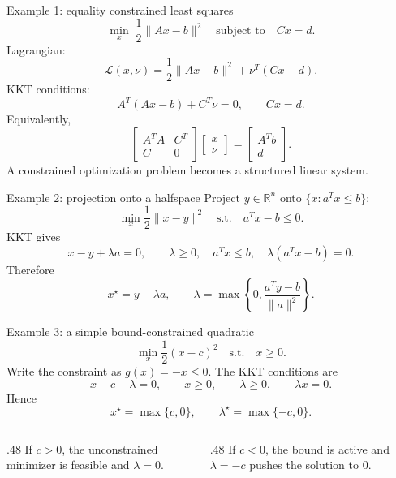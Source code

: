 \documentclass[aspectratio=169]{beamer}
\newcommand{\R}{\mathbb{R}}
\newcommand{\Lagr}{\mathcal{L}}
\begin{document}
\begin{frame}{Example 1: equality constrained least squares}
  \[
    \min_x \; \frac12\|Ax-b\|^2
    \quad \text{subject to}\quad Cx=d.
  \]
  Lagrangian:
  \[
    \Lagr(x,\nu)=\frac12\|Ax-b\|^2+\nu^T(Cx-d).
  \]
  KKT conditions:
  \[
    A^T(Ax-b)+C^T\nu=0,
    \qquad Cx=d.
  \]
  Equivalently,
  \[
    \begin{bmatrix}
      A^TA & C^T\\
      C & 0
    \end{bmatrix}
    \begin{bmatrix}x\\ \nu\end{bmatrix}
    =
    \begin{bmatrix}A^Tb\\ d\end{bmatrix}.
  \]
  A constrained optimization problem becomes a structured linear system.
\end{frame}

\begin{frame}{Example 2: projection onto a halfspace}
  Project $y\in\R^n$ onto $\{x:a^Tx\le b\}$:
  \[
    \min_x \frac12\|x-y\|^2\quad\text{s.t.}\quad a^Tx-b\le 0.
  \]
  KKT gives
  \[
    x-y+\lambda a=0,\qquad \lambda\ge0,
    \quad a^Tx\le b,
    \quad \lambda(a^Tx-b)=0.
  \]
  Therefore
  \[
    x^\star=y-\lambda a,
    \qquad
    \lambda=\max\left\{0,\frac{a^Ty-b}{\|a\|^2}\right\}.
  \]
  \begin{center}
  \end{center}
\end{frame}

\begin{frame}{Example 3: a simple bound-constrained quadratic}
  \[
    \min_x \frac12(x-c)^2\quad\text{s.t.}\quad x\ge 0.
  \]
  Write the constraint as $g(x)=-x\le0$. The KKT conditions are
  \[
    x-c-\lambda=0,
    \qquad x\ge0,
    \qquad \lambda\ge0,
    \qquad \lambda x=0.
  \]
  Hence
  \[
    x^\star=\max\{c,0\},
    \qquad
    \lambda^\star=\max\{-c,0\}.
  \]
  \vspace{.3em}
  \begin{columns}[T,totalwidth=\textwidth]
  \begin{column}{.48\textwidth}
  If $c>0$, the unconstrained minimizer is feasible and $\lambda=0$.
  \end{column}
  \begin{column}{.48\textwidth}
  If $c<0$, the bound is active and $\lambda=-c$ pushes the solution to $0$.
  \end{column}
  \end{columns}
\end{frame}
\end{document}
